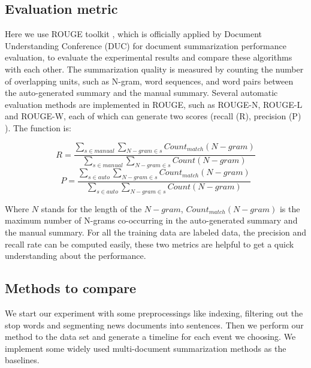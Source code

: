 \documentclass{llncs}
\begin{document}
\subsection{Evaluation metric}

Here we use ROUGE toolkit \cite{2004-Lin-p74-81} , which is officially applied by Document Understanding Conference (DUC) for document summarization performance evaluation, to evaluate the experimental results and compare these algorithms with each other. The summarization quality is measured by counting the number of overlapping units, such as N-gram, word sequences, and word pairs between the auto-generated summary and the manual summary. Several automatic evaluation methods are implemented in ROUGE, such as ROUGE-N, ROUGE-L and ROUGE-W, each of which can generate two scores (recall (R), precision (P) %
). The function is:

\begin{equation}
R=\frac{\sum_{s \in manual } \sum_{N-gram \in s} Count_{match}(N-gram) } { \sum_{s \in manual} \sum_{N-gram \in s} Count(N-gram)  } \end{equation}
\begin{equation}
P=\frac{\sum_{s \in auto } \sum_{N-gram \in s} Count_{match}(N-gram) } { \sum_{s \in auto} \sum_{N-gram \in s} Count(N-gram)  }
\end{equation}


Where $N$ stands for the length of the $N-gram$, $Count_{match}(N-gram)$ is the maximum number of N-grams co-occurring in the auto-generated summary and the manual summary. For all the training data are labeled data, the precision and recall rate can be computed easily, these two metrics are helpful to get a quick understanding about the performance.


\subsection{Methods to compare}

We start our experiment with some preprocessings like indexing, filtering out the stop words and segmenting news documents into sentences. Then we perform our method to the data set and generate a timeline for each event we choosing. We implement some widely used multi-document summarization methods as the baselines.
\end{document}
